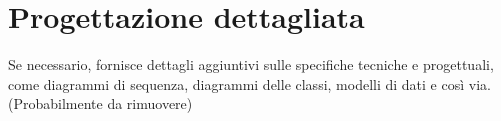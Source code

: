 \section{Progettazione dettagliata}\label{sec:Progettazione}
 Se necessario, fornisce dettagli aggiuntivi sulle specifiche tecniche e progettuali, come diagrammi di sequenza, diagrammi delle classi, modelli di dati e così via. (Probabilmente da rimuovere)
 \newpage